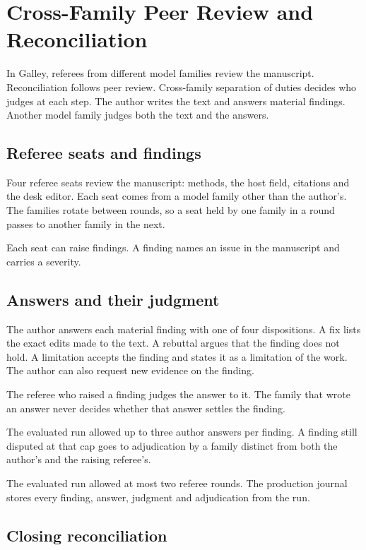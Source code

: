 \documentclass[
]{article}
\begin{document}
\section{Cross-Family Peer Review and
Reconciliation}\label{cross-family-peer-review-and-reconciliation}

In Galley, referees from different model families review the manuscript.
Reconciliation follows peer review. Cross-family separation of duties
decides who judges at each step. The author writes the text and answers
material findings. Another model family judges both the text and the
answers.

\subsection{Referee seats and
findings}\label{referee-seats-and-findings}

Four referee seats review the manuscript: methods, the host field,
citations and the desk editor. Each seat comes from a model family other
than the author's. The families rotate between rounds, so a seat held by
one family in a round passes to another family in the next.

Each seat can raise findings. A finding names an issue in the manuscript
and carries a severity.

\subsection{Answers and their
judgment}\label{answers-and-their-judgment}

The author answers each material finding with one of four dispositions.
A fix lists the exact edits made to the text. A rebuttal argues that the
finding does not hold. A limitation accepts the finding and states it as
a limitation of the work. The author can also request new evidence on
the finding.

The referee who raised a finding judges the answer to it. The family
that wrote an answer never decides whether that answer settles the
finding.

The evaluated run allowed up to three author answers per finding. A
finding still disputed at that cap goes to adjudication by a family
distinct from both the author's and the raising referee's.

The evaluated run allowed at most two referee rounds. The production
journal stores every finding, answer, judgment and adjudication from the
run.

\subsection{Closing reconciliation}\label{closing-reconciliation}
\end{document}
